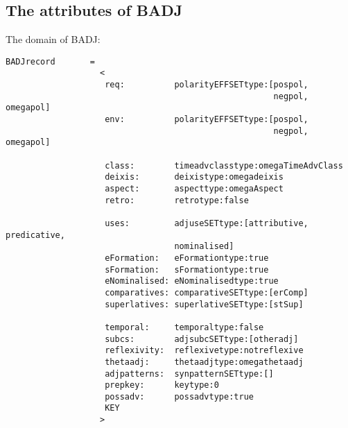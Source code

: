 \subsection{The attributes of BADJ}
 
The domain of BADJ:
 
\begin{verbatim}
BADJrecord       =
                   <
                    req:          polarityEFFSETtype:[pospol, 
                                                      negpol, omegapol]
                    env:          polarityEFFSETtype:[pospol, 
                                                      negpol, omegapol]
 
                    class:        timeadvclasstype:omegaTimeAdvClass
                    deixis:       deixistype:omegadeixis
                    aspect:       aspecttype:omegaAspect
                    retro:        retrotype:false
 
                    uses:         adjuseSETtype:[attributive, predicative,
                                  nominalised] 
                    eFormation:   eFormationtype:true  
                    sFormation:   sFormationtype:true 
                    eNominalised: eNominalisedtype:true  
                    comparatives: comparativeSETtype:[erComp]  
                    superlatives: superlativeSETtype:[stSup]  
 
                    temporal:     temporaltype:false
                    subcs:        adjsubcSETtype:[otheradj]
                    reflexivity:  reflexivetype:notreflexive
                    thetaadj:     thetaadjtype:omegathetaadj
                    adjpatterns:  synpatternSETtype:[]
                    prepkey:      keytype:0
                    possadv:      possadvtype:true
                    KEY
                   >
\end{verbatim}
 
